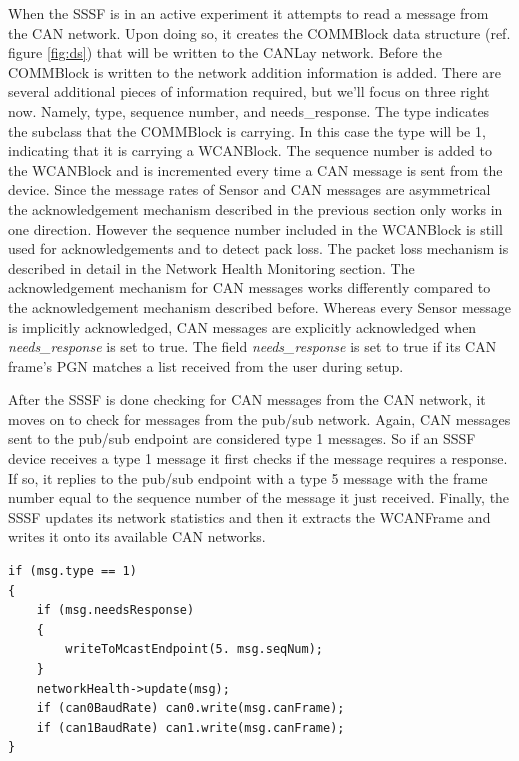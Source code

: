 \documentclass[letterpaper,twocolumn,10pt]{article}
\begin{document}
When the SSSF is in an active experiment it attempts to read a message from the CAN network. Upon doing so, it creates the COMMBlock data structure (ref. figure \ref{fig:ds}) that will be written to the CANLay network. 
Before the COMMBlock is written to the network addition information is added. There are several additional pieces of information required, but we'll focus on three right now. Namely, type, sequence number, and needs\_response. The type indicates the subclass that the COMMBlock is carrying. In this case the type will be 1, indicating that it is carrying a WCANBlock. The sequence number is added to the WCANBlock and is incremented every time a CAN message is sent from the device. Since the message rates of Sensor and CAN messages are asymmetrical the acknowledgement mechanism described in the previous section only works in one direction. However the sequence number included in the WCANBlock is still used for acknowledgements and to detect pack loss. The packet loss mechanism is described in detail in the Network Health Monitoring section. The acknowledgement mechanism for CAN messages works differently compared to the acknowledgement mechanism described before. Whereas every Sensor message is implicitly acknowledged, CAN messages are explicitly acknowledged when \textit{needs\_response} is set to true. The field \textit{needs\_response} is set to true if its CAN frame’s PGN matches a list received from the user during setup.

After the SSSF is done checking for CAN messages from the CAN network, it moves on to check for messages from the pub/sub network. Again, CAN messages sent to the pub/sub endpoint are considered type 1 messages. So if an SSSF device receives a type 1 message it first checks if the message requires a response. If so, it replies to the pub/sub endpoint with a type 5 message with the frame number equal to the sequence number of the message it just received. Finally, the SSSF updates its network statistics and then it extracts the WCANFrame and writes it onto its available CAN networks.
\begin{verbatim}
if (msg.type == 1)
{
    if (msg.needsResponse)
    {
        writeToMcastEndpoint(5. msg.seqNum);
    }
    networkHealth->update(msg);
    if (can0BaudRate) can0.write(msg.canFrame);
    if (can1BaudRate) can1.write(msg.canFrame);
}
\end{verbatim}
\end{document}
